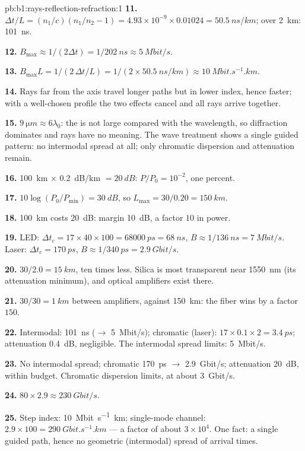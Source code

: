 \begin{solution}{pb:b1:rays-reflection-refraction:1}
\textbf{11.} $\Delta t/L = (n_1/c)(n_1/n_2 - 1) = 4.93\times10^{-9} \times
0.01024 = \qty{50.5}{ns/km}$; over \qty{2}{km}: \qty{101}{ns}.

\textbf{12.} $B_{\max} \approx 1/(2\Delta t) = 1/\qty{202}{ns} \approx
\qty{5}{Mbit/s}$.

\textbf{13.} $B_{\max} L = 1/(2\,\Delta t/L) = 1/(2 \times
\qty{50.5}{ns/km}) \approx \qty{10}{Mbit.s^{-1}.km}$.

\textbf{14.} Rays far from the axis travel longer paths but in lower
index, hence faster; with a well-chosen profile the two effects cancel
and all rays arrive together.

\textbf{15.} $\qty{9}{\micro m} \approx 6\lambda_0$: the  is not
large compared with the wavelength, so diffraction dominates and rays
have no meaning. The wave treatment shows a single guided pattern: no
intermodal spread at all; only chromatic dispersion and attenuation
remain.

\textbf{16.} \qty{100}{km} $\times$ \qty{0.2}{dB/km} $= \qty{20}{dB}$:
$P/P_0 = 10^{-2}$, one percent.

\textbf{17.} $10\log(P_0/P_{\min}) = \qty{30}{dB}$, so $L_{\max} =
30/0.20 = \qty{150}{km}$.

\textbf{18.} \qty{100}{km} costs \qty{20}{dB}: margin \qty{10}{dB}, a
factor $10$ in power.

\textbf{19.} LED: $\Delta t_c = 17 \times 40 \times 100 = \qty{68000}{ps}
= \qty{68}{ns}$, $B \approx 1/\qty{136}{ns} = \qty{7}{Mbit/s}$. Laser:
$\Delta t_c = \qty{170}{ps}$, $B \approx 1/\qty{340}{ps} =
\qty{2.9}{Gbit/s}$.

\textbf{20.} $30/2.0 = \qty{15}{km}$, ten times less. Silica is most
transparent near \qty{1550}{nm} (its attenuation minimum), and optical
amplifiers exist there.

\textbf{21.} $30/30 = \qty{1}{km}$ between amplifiers, against
\qty{150}{km}: the fiber wins by a factor $150$.

\textbf{22.} Intermodal: \qty{101}{ns} ($\to$ \qty{5}{Mbit/s});
chromatic (laser): $17 \times 0.1 \times 2 = \qty{3.4}{ps}$;
attenuation \qty{0.4}{dB}, negligible. The intermodal spread limits:
\qty{5}{Mbit/s}.

\textbf{23.} No intermodal spread; chromatic \qty{170}{ps} $\to$
\qty{2.9}{Gbit/s}; attenuation \qty{20}{dB}, within budget. Chromatic
dispersion limits, at about \qty{3}{Gbit/s}.

\textbf{24.} $80 \times 2.9 \approx \qty{230}{Gbit/s}$.

\textbf{25.} Step index: \qty{10}{Mbit.s^{-1}.km}; single-mode channel:
$2.9 \times 100 = \qty{290}{Gbit.s^{-1}.km}$ --- a factor of about
$3\times10^4$. One fact: a single guided path, hence no geometric
(intermodal) spread of arrival times.
\end{solution}
